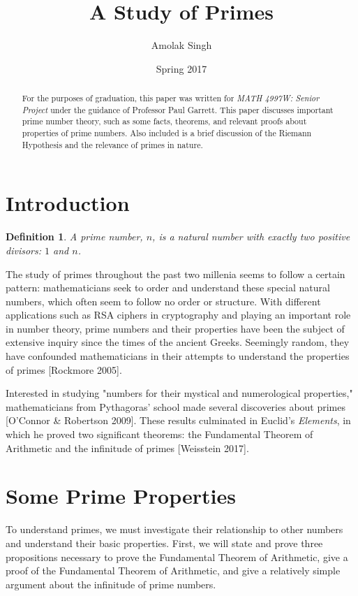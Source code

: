 \documentclass[11pt]{article}
\title{A Study of Primes}
\author{Amolak Singh}
\date{Spring 2017}
\begin{document}
\maketitle

\begin{abstract}
\noindent
For the purposes of graduation, this paper was written for {\it MATH 4997W: Senior Project} under the guidance of Professor Paul Garrett. This paper discusses important prime number theory, such as some facts, theorems, and relevant proofs about properties of prime numbers. Also included is a brief discussion of the Riemann Hypothesis and the relevance of primes in nature.
\end{abstract}

\tableofcontents

\pagebreak

\section{Introduction}
\newtheorem{mydef}{Definition}
\begin{mydef}
A prime number, $n$, is a natural number with exactly two positive divisors: $1$ and $n$.
\end{mydef}

The study of primes throughout the past two millenia seems to follow a certain pattern: mathematicians seek to order and understand these special natural numbers, which often seem to follow no order or structure. With  different applications such as RSA ciphers in cryptography and playing an important role in number theory, prime numbers and their properties have been the subject of extensive inquiry since the times of the ancient Greeks. Seemingly random, they have confounded mathematicians in their attempts to understand the properties of primes [Rockmore 2005]. 

Interested in studying "numbers for their mystical and numerological properties," mathematicians from Pythagoras' school made several discoveries about primes [O'Connor \& Robertson 2009]. These results culminated in Euclid's {\it Elements}, in which he proved two significant theorems: the Fundamental Theorem of Arithmetic and the infinitude of primes [Weisstein 2017]. 

\section{Some Prime Properties}

To understand primes, we must investigate their relationship to other numbers and understand their basic properties. First, we will state and prove three propositions necessary to prove the Fundamental Theorem of Arithmetic, give a proof of the Fundamental Theorem of Arithmetic, and give a relatively simple argument about the infinitude of prime numbers.
\end{document}

